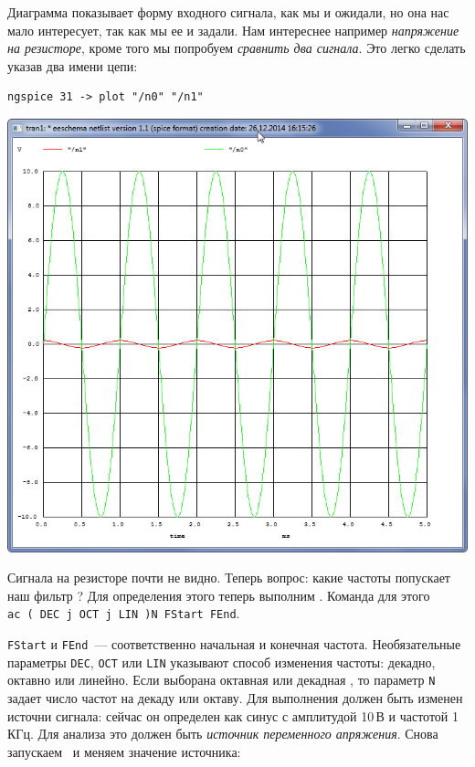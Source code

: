 \bigskip
Диаграмма показывает форму входного сигнала, как мы и ожидали, но она нас мало
интересует, так как мы ее и задали. Нам интереснее например \emph{напряжение на
резисторе}, кроме того мы попробуем \emph{сравнить два сигнала}.
Это легко сделать указав два имени цепи:

\begin{verbatim}
ngspice 31 -> plot "/n0" "/n1"
\end{verbatim}

\clearpage
\noindent\includegraphics[height=\textheight]{spice/spice3.png}
\clearpage


Сигнала на резисторе почти не видно. Теперь вопрос: какие частоты попускает наш
фильтр ? Для определения этого теперь выполним . Команда для этого\\ \verb|ac ( DEC j OCT j LIN )N FStart FEnd|.

\verb|FStart| и \verb|FEnd|\ --- соответственно начальная и конечная частота.
Необязательные параметры \verb|DEC|, \verb|OCT| или \verb|LIN| указывают способ
изменения частоты: декадно, октавно или линейно. Если выборана октавная или
декадная , то параметр \verb|N| задает число
частот на декаду или октаву. Для выполнения  должен быть
изменен источни сигнала: сейчас он определен как синус с амплитудой 10\,В и
частотой 1\,КГц. Для анализа это должен быть \emph{источник переменного
апряжения}. Снова запускаем \eeschema\ и меняем значение источника:

